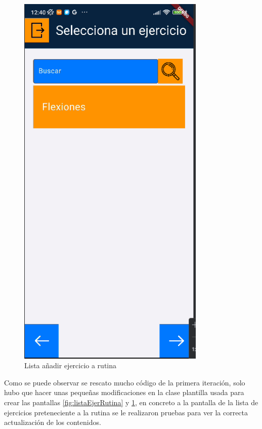 \begin{figure}[H]
   \centering
    \includegraphics[width=0.8\textwidth]{pantallas/listaAddEjerRut.png}
    \caption{Lista añadir ejercicio a rutina}
    \label{fig:listaAddEjerRut}
\end{figure}

Como se puede observar se rescato mucho código de la primera iteración, solo hubo que hacer unas pequeñas modificaciones en la clase plantilla usada para crear las pantallas \cref{fig:listaEjerRutina} y \cref{fig:listaAddEjerRut}, en concreto a la pantalla de la lista de ejercicios preteneciente a la rutina se le realizaron pruebas para ver la correcta actualización de los contenidos.

